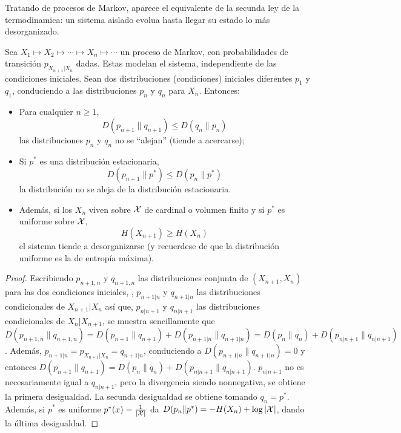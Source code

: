 

Tratando de procesos  de Markov, aparece el equivalente de la  secunda ley de la
termodinamica:  un  sistema  aislado  evolua  hasta  llegar  su  estado  lo  m\'as
desorganizado.

\begin{lema}
  Sea $X_1 \mapsto X_2 \mapsto \cdots  \mapsto X_n \mapsto \cdots$ un proceso de
  Markov,  con probabilidades  de transici\'on  $p_{X_{n+1}|X_n}$  dadas.  Estas
  modelan  el sistema,  independiente de  las condiciones  iniciales.   Sean dos
  distribuciones (condiciones) iniciales diferentes $p_1$ y $q_1$, conduciendo a
  las distribuciones $p_n$ y $q_n$ para $X_n$. Entonces:
%
\begin{itemize}
\item  Para cualquier  $n \ge  1$,
  \[
  D(p_{n+1}\|q_{n+1}) \le D(q_n\|p_n)
  \]
  las distribuciones $p_n$ y $q_n$ no se ``alejan'' (tiende a acercarse);
%
\item  Si  $p^*$  es  una  distribuci\'on  estacionaria,
  \[
  D(p_{n+1}\|p^*) \le D(p_n\|p^*)
  \]
  la distribuci\'on no se aleja de la distribuci\'on estacionaria.
%
\item Adem\'as, si  los $X_n$ viven sobre  $\mathcal{X}$ de cardinal o volumen  finito y si
  $p^*$ es  uniforme sobre $\mathcal{X}$,
  \[
  H(X_{n+1}) \ge H(X_n)
  \]
  el  sistema tiende  a desorganizarse  (y recuerdese  de que  la distribuci\'on
  uniforme es la de entrop\'ia m\'axima).
\end{itemize}
\end{lema}
%
\begin{proof}
  Escribiendo   $p_{n+1,n}$  y  $q_{n+1,n}$   las  distribuciones   conjunta  de
  $(X_{n+1},X_n)$  para   las  dos   condiciones  iniciales,  ,   $p_{n+1|n}$  y
  $q_{n+1|n}$  las  distribuciones  condicionales  de $X_{n+1}|X_n$  as\'i  que,
  $p_{n|n+1}$ y  $q_{n|n+1}$ las distribuciones  condicionales de $X_n|X_{n+1}$,
  se muestra sencillamente  que $D(p_{n+1,n}\|q_{n+1,n}) = D(p_{n+1}\|q_{n+1}) +
  D(p_{n+1|n}\|q_{n+1|n})  =  D(p_n\|q_n)  +  D(p_{n|n+1}\|q_{n|n+1})$.  Adem\'as,
  $p_{n+1|n}     =    p_{X_{n+1}|X_n}     =     q_{n+1|n}$,    conduciendo     a
  $D(p_{n+1|n}\|q_{n+1|n}) = 0$ y  entonces $D(p_{n+1}\|q_{n+1}) = D(p_n\|q_n) +
  D(p_{n|n+1}\|q_{n|n+1})$.   $p_{n|n+1}$   no   es   necesariamente   igual   a
  $q_{n|n+1}$,  pero la divergencia  siendo nonnegativa,  se obtiene  la primera
  desigualdad.  La secunda desigualdad se  obtiene tomando $q_n = p^*$.  Adem\'as,
  si $p^*$  es uniforme  $p^*(x) = \frac{1}{|\mathcal{X}|}$  da $D(p_n\|p^*) =  -H(X_n) +
  \log |\mathcal{X}|$, dando la \'ultima desigualdad.
\end{proof}


